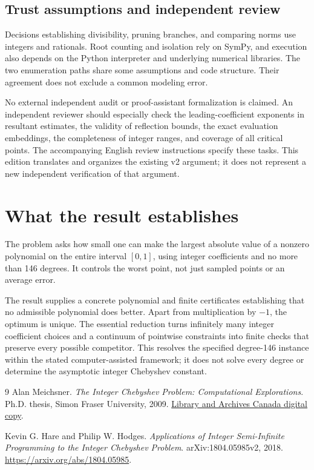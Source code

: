 \documentclass[11pt,a4paper]{article}
\begin{document}
\subsection{Trust assumptions and independent review}
Decisions establishing divisibility, pruning branches, and comparing norms use integers and rationals. Root counting and isolation rely on SymPy, and execution also depends on the Python interpreter and underlying numerical libraries. The two enumeration paths share some assumptions and code structure. Their agreement does not exclude a common modeling error.

No external independent audit or proof-assistant formalization is claimed. An independent reviewer should especially check the leading-coefficient exponents in resultant estimates, the validity of reflection bounds, the exact evaluation embeddings, the completeness of integer ranges, and coverage of all critical points. The accompanying English review instructions specify these tasks. This edition translates and organizes the existing v2 argument; it does not represent a new independent verification of that argument.

\section{What the result establishes}
The problem asks how small one can make the largest absolute value of a nonzero polynomial on the entire interval $[0,1]$, using integer coefficients and no more than 146 degrees. It controls the worst point, not just sampled points or an average error.

The result supplies a concrete polynomial and finite certificates establishing that no admissible polynomial does better. Apart from multiplication by $-1$, the optimum is unique. The essential reduction turns infinitely many integer coefficient choices and a continuum of pointwise constraints into finite checks that preserve every possible competitor. This resolves the specified degree-146 instance within the stated computer-assisted framework; it does not solve every degree or determine the asymptotic integer Chebyshev constant.

\begin{thebibliography}{9}
Alan Meichsner.
\emph{The Integer Chebyshev Problem: Computational Explorations}.
Ph.D. thesis, Simon Fraser University, 2009.
\href{https://www.collectionscanada.gc.ca/obj/thesescanada/vol2/002/NR59810.PDF}{Library and Archives Canada digital copy}.

Kevin G. Hare and Philip W. Hodges.
\emph{Applications of Integer Semi-Infinite Programming to the Integer Chebyshev Problem}.
arXiv:1804.05985v2, 2018.
\url{https://arxiv.org/abs/1804.05985}.
\end{thebibliography}
\end{document}
